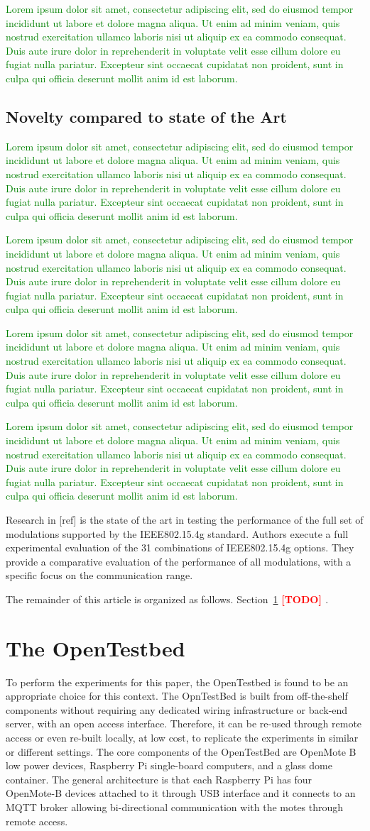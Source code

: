 \documentclass[journal]{IEEEtran}
\newcommand{\todo}[1]      {\textbf{\textcolor{red}{[TODO] #1}}}
\newcommand{\lorem}        {\textcolor{green}{Lorem ipsum dolor sit amet, consectetur adipiscing elit, sed do eiusmod tempor incididunt ut labore et dolore magna aliqua. Ut enim ad minim veniam, quis nostrud exercitation ullamco laboris nisi ut aliquip ex ea commodo consequat. Duis aute irure dolor in reprehenderit in voluptate velit esse cillum dolore eu fugiat nulla pariatur. Excepteur sint occaecat cupidatat non proident, sunt in culpa qui officia deserunt mollit anim id est laborum.}}
\begin{document}
\lorem

\subsection{Novelty compared to state of the Art}



\lorem 

\lorem

\lorem

\lorem


Research in [ref] is the state of the art in testing the performance of the full set of modulations supported by the IEEE802.15.4g standard.
    Authors execute a full experimental evaluation of the 31 combinations of IEEE802.15.4g options.
    They provide a comparative evaluation of the performance of all modulations, with a specific focus on the communication range. 



The remainder of this article is organized as follows.
Section~\ref{sec:opentested} \todo{}.

\section{The OpenTestbed}
\label{sec:opentested}

To perform the experiments for this paper, the OpenTestbed \cite{munoz19opentestbed} is found to be an appropriate choice for this context.
The OpnTestBed is built from off-the-shelf components without requiring any dedicated wiring infrastructure or back-end server, with an open access interface. 
Therefore, it can be re-used through remote access or even re-built locally, at low cost, to replicate the experiments in similar or different settings.  
The core components of the OpenTestBed are OpenMote B low power devices, Raspberry Pi single-board computers, and a glass dome container.
The general architecture is that each Raspberry Pi has four OpenMote-B devices attached to it through USB interface and it connects to an MQTT broker allowing bi-directional communication with the motes through remote access. 
\end{document}

